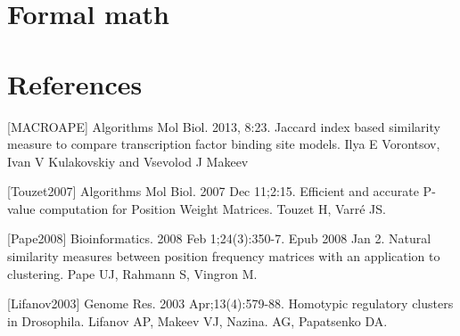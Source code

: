 \documentclass[draft]{article}
\newcommand*{\pvalue}{\mbox{P-value}}
\begin{document}








\section{Formal math}
  
  

\section*{References}
[MACROAPE] Algorithms Mol Biol. 2013, 8:23.
Jaccard index based similarity measure to compare transcription factor binding site models.
Ilya E Vorontsov, Ivan V Kulakovskiy and Vsevolod J Makeev

[Touzet2007] Algorithms Mol Biol. 2007 Dec 11;2:15. Efficient and accurate \pvalue  
computation for Position Weight Matrices. Touzet H, Varré JS.

[Pape2008] Bioinformatics. 2008 Feb 1;24(3):350-7. Epub 2008 Jan 2. Natural similarity 
measures between position frequency matrices with an application to clustering. Pape UJ, 
Rahmann S, Vingron M.

[Lifanov2003] Genome Res. 2003 Apr;13(4):579-88. Homotypic regulatory clusters in 
Drosophila. Lifanov AP, Makeev VJ, Nazina. AG, Papatsenko DA.
\end{document}
